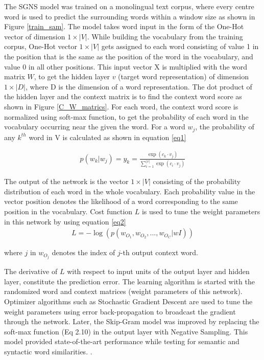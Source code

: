 \documentclass[12pt]{report} %
\begin{document}
The SGNS model was trained on a monolingual text corpus, where every centre word is used to predict the surrounding words within a window size as shown in Figure \ref{train_sam}.
The model takes word input in the form of the One-Hot vector of dimension $1\times|V|$. While building the vocabulary from the training corpus, One-Hot vector $1\times|V|$ gets assigned to each word consisting of value 1 in the position that is the same as the position of the word in the vocabulary, and value 0 in all other positions. This input vector X is multiplied with the word matrix $W$, to get the hidden layer $v$ (target word representation) of dimension $1\times|D|$, where D is the dimension of a word representation. The dot product of the hidden layer and the context matrix is to find the context word score as shown in Figure \ref{C_W_matrics}. For each word, the context word score is normalized using soft-max function, to get the probability of each word in the vocabulary occurring near the given the word. For a word $w_{j}$, the probability of any $k^{th}$ word in V is calculated as shown in equation \ref{eq1}

\begin{align}
\label{eq1}
p(w_{k} | w_{j}) = y_{k} = \frac{\exp( c_{k} \cdot v_{j})}{\sum_{i=1}^{|v|} \exp(c_{i} \cdot v_{j}) } 
\end{align}


The output of the network is the vector $1\times|V|$ consisting of the probability distribution of each word in the whole vocabulary. Each probability value in the vector position denotes the likelihood of a word corresponding to the same position in the vocabulary. Cost function $L$ is used to tune the weight parameters in this network by using equation \ref{eq2}
\begin{align}
\label{eq2}
L = - \log ( p(w_{O_1}, w_{O_2}, . . . , w_{O_C}|wI))
\end{align} 

where $j$ in $w_{O_j}$ denotes the index of $j$-th output context word. 


The derivative of $L$ with respect to input units of the output layer and hidden layer, constitute the prediction error. The learning algorithm is started with the randomized word and context matrices (weight parameters of this network). Optimizer algorithms such as Stochastic Gradient Descent are used to tune the weight parameters using error back-propagation to broadcast the gradient through the network. Later, the Skip-Gram model was improved by replacing the soft-max function (Eq 2.10) in the output layer with Negative Sampling. This model provided state-of-the-art performance while testing for semantic and syntactic word similarities. \citep{mikolov2014word2vec}. 
\end{document}
